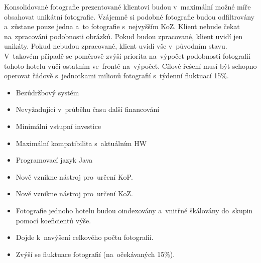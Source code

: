Konsolidované fotografie prezentované klientovi budou v~maximální možné míře obsahovat unikátní fotografie. Vzájemně si podobné fotografie budou odfiltrovány a~zůstane pouze jedna a~to fotografie s~nejvyšším KoZ. Klient nebude čekat na~zpracování podobnosti obrázků. Pokud budou zpracované, klient uvidí jen unikáty. Pokud nebudou zpracované, klient uvidí vše v~původním stavu. V~takovém případě se poměrově zvýší priorita na~výpočet podobnosti fotografií tohoto hotelu vůči ostatním ve~frontě na~výpočet. Cílové řešení musí být schopno operovat řádově s~jednotkami milionů fotografií s~týdenní fluktuací 15\%.

\begin{itemize}
	\setlength{\parskip}{0pt}
	\setlength{\itemsep}{0pt}
	\item {Bezúdržbový systém}
	\item {Nevyžadující v~průběhu času další financování}
	\item {Minimální vstupní investice}
	\item {Maximální kompatibilita s~aktuálním HW}
	\item {Programovací jazyk Java~\cite{java}}
\end{itemize}

\begin{itemize}
	\setlength{\parskip}{0pt}
	\setlength{\itemsep}{0pt}
	\item {Nově vznikne nástroj pro~určení KoP.}
	\item {Nově vznikne nástroj pro~určení KoZ.}
	\item {Fotografie jednoho hotelu budou oindexovány a~vnitřně škálovány do~skupin pomocí koeficientů výše.}
	\item {Dojde k~navýšení celkového počtu fotografií.}
	\item {Zvýší se fluktuace fotografií (na~očekávaných 15\%).}
\end{itemize}

